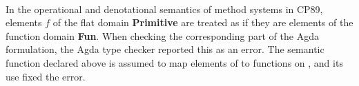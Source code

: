 \begin{AgdaAlign}
\begin{code}
\AgdaSpace{}%
\AgdaSymbol{:}\AgdaSpace{}%
\AgdaSymbol{;}\AgdaSpace{}%
\AgdaSpace{}%
\AgdaSymbol{:}\AgdaSpace{}%
\AgdaSymbol{;}\AgdaSpace{}%
\AgdaSpace{}%
\AgdaSymbol{:}\AgdaSpace{}%
\AgdaSpace{}%
\AgdaSpace{}%
\<%
\\
\>[0]\AgdaSpace{}%
\AgdaSpace{}%
\AgdaSymbol{:}\AgdaSpace{}%
\AgdaSpace{}%
\AgdaSpace{}%
\AgdaSymbol{;}\AgdaSpace{}%
\AgdaSpace{}%
\AgdaSpace{}%
\AgdaSymbol{:}\AgdaSpace{}%
\AgdaSpace{}%
\AgdaSpace{}%
\AgdaSymbol{;}\AgdaSpace{}%
\AgdaSpace{}%
\AgdaSymbol{:}\AgdaSpace{}%
\AgdaSpace{}%
\AgdaSpace{}%
\<%
\end{code}
%
In the operational and denotational semantics of method systems in CP89,
elements $f$ of the flat domain \textbf{Primitive} are treated
as if they are elements of the function domain \textbf{Fun}.
When checking the corresponding part of the Agda formulation,
the Agda type checker reported this as an error.
The semantic function  declared above is assumed to map
elements of  to functions on ,
and its use fixed the error.


\end{AgdaAlign}
